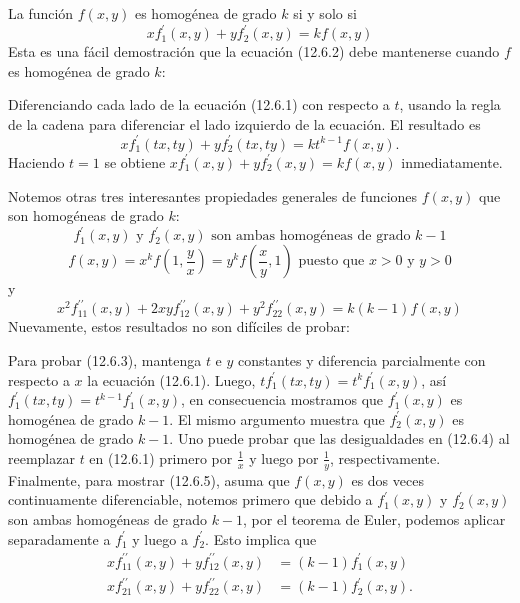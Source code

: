 \begin{frame}
La función $f\left(x,y\right)$ es homogénea de grado $k$ si y solo si
\begin{equation}
xf^{\prime}_{1}\left(x,y\right)+yf^{\prime}_{2}\left(x,y\right)=kf\left(x,y\right)
\end{equation}
Esta es una fácil demostración que la ecuación (12.6.2) debe mantenerse cuando $f$ es homogénea de grado $k$:

Diferenciando cada lado de la ecuación (12.6.1) con respecto a $t$, usando la regla de la cadena para diferenciar el lado izquierdo de la ecuación. El resultado es \[ xf^{\prime}_{1}\left(tx,ty\right)+yf^{\prime}_{2}\left(tx,ty\right)=kt^{k-1}f\left(x,y\right). \] Haciendo $t=1$ se obtiene $xf^{\prime}_{1}\left(x,y\right)+yf^{\prime}_{2}\left(x,y\right)=kf\left(x,y\right)$ inmediatamente.
\end{frame}

Notemos otras tres interesantes propiedades generales de funciones $f\left(x,y\right)$ que son homogéneas de grado $k$:
\begin{equation}
f^{\prime}_{1}\left(x,y\right)\text{ y }f^{\prime}_{2}\left(x,y\right)\text{ son ambas homogéneas de grado }k-1
\end{equation}
\begin{equation}
f\left(x,y\right)=x^{k}f\left(1,\frac{y}{x}\right)=y^{k}f\left(\frac{x}{y},1\right)\text{ puesto que }x>0\text{ y }y>0
\end{equation}
y
\begin{equation}
x^{2}f^{\prime\prime}_{11}\left(x,y\right)+2xyf^{\prime\prime}_{12}\left(x,y\right)+y^{2}f^{\prime\prime}_{22}\left(x,y\right)=k\left(k-1\right)f\left(x,y\right)
\end{equation}
Nuevamente, estos resultados no son difíciles de probar:

Para probar (12.6.3), mantenga $t$ e $y$ constantes y diferencia parcialmente con respecto a $x$ la ecuación (12.6.1). Luego, $tf^{\prime}_{1}\left(tx,ty\right)=t^{k}f^{\prime}_{1}\left(x,y\right)$, así $f^{\prime}_{1}\left(tx,ty\right)=t^{k-1}f^{\prime}_{1}\left(x,y\right)$, en consecuencia mostramos que $f^{\prime}_{1}\left(x,y\right)$ es homogénea de grado $k-1$. El mismo argumento muestra que $f^{\prime}_{2}\left(x,y\right)$ es homogénea de grado $k-1$. Uno puede probar que las desigualdades en (12.6.4) al reemplazar $t$ en (12.6.1) primero por $\frac{1}{x}$ y luego por $\frac{1}{y}$, respectivamente. Finalmente, para mostrar (12.6.5), asuma que $f\left(x,y\right)$ es dos veces continuamente diferenciable, notemos primero que debido a $f^{\prime}_{1}\left(x,y\right)$ y $f^{\prime}_{2}\left(x,y\right)$ son ambas homogéneas de grado $k-1$, por el teorema de Euler, podemos aplicar separadamente a $f^{\prime}_{1}$ y luego a $f^{\prime}_{2}$. Esto implica que
\begin{align}
xf^{\prime\prime}_{11}\left(x,y\right)+yf^{\prime\prime}_{12}\left(x,y\right)&=\left(k-1\right)f^{\prime}_{1}\left(x,y\right)\\
xf^{\prime\prime}_{21}\left(x,y\right)+yf^{\prime\prime}_{22}\left(x,y\right)&=\left(k-1\right)f^{\prime}_{2}\left(x,y\right).
\end{align}


